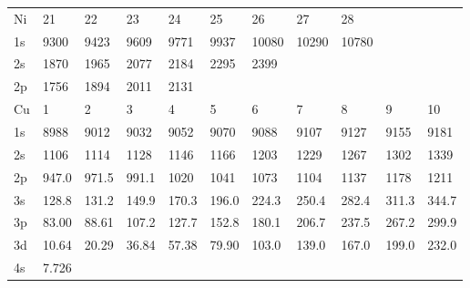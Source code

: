 \begin{table}
\begin{tabular}{lllllllllll}
Ni&  21&  22&  23&  24&  25&
26&  27&  28\\
1s&  9300&  9423&  9609&  9771&  9937& 10080& 10290& 10780\\
2s& 1870& 1965&
2077&  2184&  2295&  2399\\
2p&  1756&  1894&  2011&  2131\\
\hline
Cu&   1&   2&   3&   4&   5&
6& 7&   8&   9&  10\\
\hline
1s&  8988&  9012&  9032&  9052&  9070&  9088&  9107&  9127&  9155&
9181\\
2s&  1106&  1114&  1128&  1146& 1166&  1203&  1229&  1267&  1302&  1339\\
2p& 947.0&
971.5& 991.1&  1020&  1041&  1073&  1104&  1137&  1178&  1211\\
3s& 128.8& 131.2& 149.9&
170.3& 196.0& 224.3& 250.4& 282.4& 311.3& 344.7\\
3p& 83.00& 88.61& 107.2& 127.7& 152.8&
180.1& 206.7& 237.5& 267.2& 299.9\\
3d& 10.64& 20.29& 36.84& 57.38& 79.90& 103.0& 139.0&
167.0& 199.0& 232.0\\
4s& 7.726\\
\hline
\end{tabular}
\end{table}


